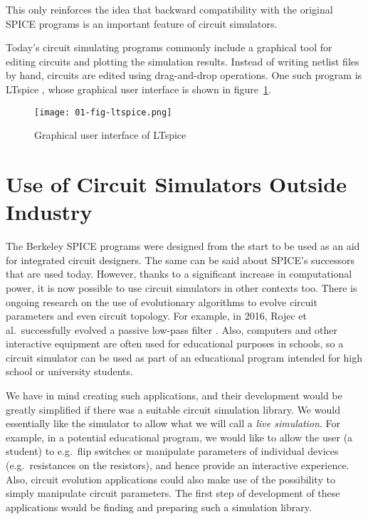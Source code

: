 This only reinforces the idea that backward compatibility with the original SPICE programs is an important feature of circuit simulators.

Today's circuit simulating programs commonly include a graphical tool for editing circuits and plotting the simulation results. Instead of writing netlist files by hand, circuits are edited using drag-and-drop operations. One such program is LTspice \cite{ltspice-web}, whose graphical user interface is shown in figure~\ref{fig:ltspice-gui}.

\begin{figure}[h]
	\centering
	\texttt{[image: 01-fig-ltspice.png]}
	\caption{Graphical user interface of LTspice}
	\label{fig:ltspice-gui}
\end{figure}

\section{Use of Circuit Simulators Outside Industry}
The Berkeley SPICE programs were designed from the start to be used as an aid for integrated circuit designers. The same can be said about SPICE's successors that are used today. However, thanks to a significant increase in computational power, it is now possible to use circuit simulators in other contexts too. There is ongoing research on the use of evolutionary algorithms to evolve circuit parameters and even circuit topology. For example, in 2016, Rojec et al.\ successfully evolved a passive low-pass filter \cite{Rojec2016}. Also, computers and other interactive equipment are often used for educational purposes in schools, so a circuit simulator can be used as part of an educational program intended for high school or university students.

We have in mind creating such applications, and their development would be greatly simplified if there was a suitable circuit simulation library. We would essentially like the simulator to allow what we will call a \textit{live simulation}. For example, in a potential educational program, we would like to allow the user (a student) to e.g.\ flip switches or manipulate parameters of individual devices (e.g.\ resistances on the resistors), and hence provide an interactive experience. Also, circuit evolution applications could also make use of the possibility to simply manipulate circuit parameters. The first step of development of these applications would be finding and preparing such a simulation library.


